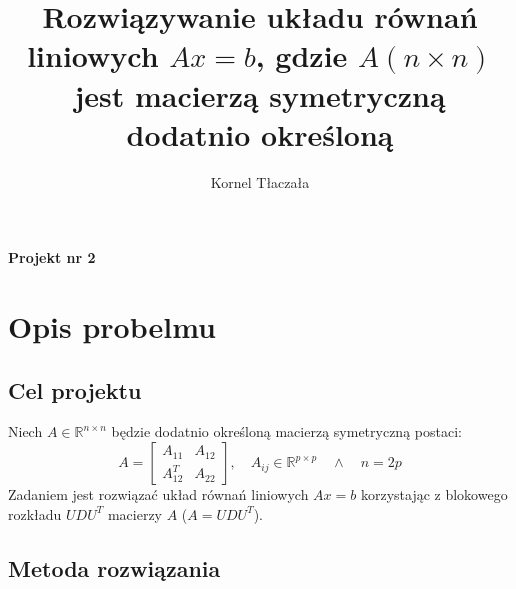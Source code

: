 \documentclass{article}
\title{Rozwiązywanie układu równań liniowych \(Ax = b\), gdzie \(A(n \times n)\) jest macierzą symetryczną dodatnio określoną}
\author{Kornel Tłaczała}
\begin{document}
\maketitle

\vspace{0.2cm}
\begin{center}
\textbf{\large Projekt nr 2} \\
\end{center}

\section{Opis probelmu}
    \subsection*{Cel projektu}
Niech \(A \in \mathbb{R}^{n \times n} \) będzie dodatnio określoną macierzą symetryczną postaci:
\[
A=\begin{bmatrix}
    A_{11} & A_{12}\\
    A_{12}^T & A_{22}
\end{bmatrix},
\quad A_{ij} \in \mathbb{R}^{p \times p} \quad \wedge \quad n=2p
\]
Zadaniem jest rozwiązać układ równań liniowych \(Ax = b\) korzystając z blokowego rozkładu \(UDU^T\) macierzy \(A\) (\(A = UDU^T\)).
    \subsection*{Metoda rozwiązania}
\end{document}
